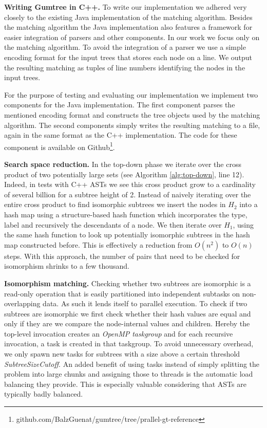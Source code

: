 \documentclass[letterpaper]{article}
\newcommand{\mypar}[1]{{\bf #1.}}
\begin{document}
\mypar{Writing Gumtree in C++}
To write our implementation we adhered very closely to the existing Java implementation of the matching algorithm.
Besides the matching algorithm the Java implementation also features a framework for easier integration of parsers and other components.
In our work we focus only on the matching algorithm.
To avoid the integration of a parser we use a simple encoding format for the input trees that stores each node on a line.
We output the resulting matching as tuples of line numbers identifying the nodes in the input trees.

For the purpose of testing and evaluating our implementation we implement two components for the Java implementation.
The first component parses the mentioned encoding format and constructs the tree objects used by the matching algorithm.
The second components simply writes the resulting matching to a file, again in the same format as the C++ implementation.
The code for these component is available on Github\footnote{github.com/BalzGuenat/gumtree/tree/prallel-gt-reference}.

\mypar{Search space reduction}
In the top-down phase we iterate over the cross product of two potentially large sets (see Algorithm \ref{alg:top-down}, line 12).
Indeed, in tests with C++ ASTs we see this cross product grow to a cardinality of several billion for a subtree height of 2.
Instead of naively iterating over the entire cross product to find isomorphic subtrees we insert the nodes in $H_2$ into a hash map using a structure-based hash function which incorporates the type, label and recursively the descendants of a node.
We then iterate over $H_1$, using the same hash function to look up potentially isomorphic subtrees in the hash map constructed before.
This is effectively a reduction from $O(n^2)$ to $O(n)$ steps.
With this approach, the number of pairs that need to be checked for isomorphism shrinks to a few thousand.

\mypar{Isomorphism matching} %
Checking whether two subtrees are isomorphic is a read-only operation that is easily partitioned into independent subtasks on non-overlapping data.
As such it lends itself to parallel execution.
To check if two subtrees are isomorphic we first check whether their hash values are equal and only if they are we compare the node-internal values and children.
Hereby the top-level invocation creates an \emph{OpenMP taskgroup} and for each recursive invocation, a task is created in that taskgroup.
To avoid unnecessary overhead, we only spawn new tasks for subtrees with a size above a certain threshold \emph{SubtreeSizeCutoff}.
An added benefit of using tasks instead of simply splitting the problem into large chunks and assigning those to threads is the automatic load balancing they provide.
This is especially valuable considering that ASTs are typically badly balanced.
\end{document}
